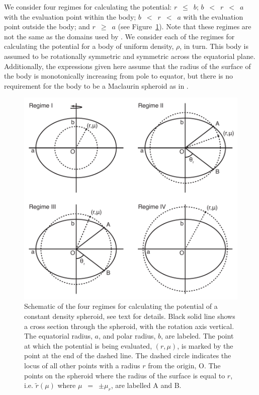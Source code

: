 \documentclass[11pt, oneside]{article}   	%
\begin{document}
We consider four regimes for calculating the potential: $r$~$\leq$~$b$; $b$~$<$~$r$~$<$~$a$ with the evaluation point within the body; $b$~$<$~$r$~$<$~$a$ with the evaluation point outside the body; and $r$~$\geq$~$a$ (see Figure~\ref{sup:fig:Regimes}).
Note that these regimes are not the same as the domains used by \cite{Kong2013}. We consider each of the regimes for calculating the potential for a body of uniform density, $\rho$, in turn.
This body is assumed to be rotationally symmetric and symmetric across the equatorial plane.
Additionally, the expressions given here assume that the radius of the surface of the body is monotonically increasing from pole to equator, but there is no requirement for the body to be a Maclaurin spheroid as in \cite{Kong2013}.

\begin{figure}
   \centering
   \includegraphics[scale=0.8333333]{Figures/HERCULES_regime_diagram2.pdf} 
   \caption{Schematic of the four regimes for calculating the potential of a constant density spheroid, see text for details. Black solid line shows a cross section through the spheroid, with the rotation axis vertical. The equatorial radius, $a$, and polar radius, $b$, are labeled. The point at which the potential is being evaluated, $(r,\mu)$, is marked by the point at the end of the dashed line. The dashed circle indicates the locus of all other points with a radius $r$ from the origin, O. The points on the spheroid where the radius of the surface is equal to $r$, i.e. $\tilde{r}(\mu)$ where $\mu$~$=$~$\pm \mu_r$, are labelled A and B.}
   \label{sup:fig:Regimes}
\end{figure}
\end{document}
